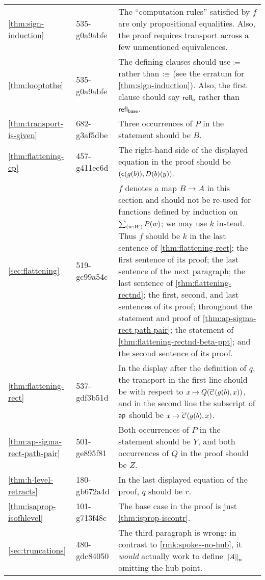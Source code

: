 \documentclass[
%
%
11pt %
]{article}
\begin{document}
\begin{longtable}{llp{10.5cm}}
  \cref{thm:sign-induction}
  & 535-g0a9abfe
  & The ``computation rules'' satisfied by $f$ are only propositional equalities.
  Also, the proof requires transport across a few unmentioned equivalences.\\
  \cref{thm:looptothe}
  & 535-g0a9abfe
  & The defining clauses should use $\defid$ rather than $\defeq$ (see the erratum for \cref{thm:sign-induction}).
  Also, the first clause should say $\refl{a}$ rather than $\refl{\base}$.\\
  \cref{thm:transport-is-given}
  & 682-g3af5dbe
  & Three occurrences of $P$ in the statement should be $B$.\\
  \cref{thm:flattening-cp}
  & 457-g411ec6d
  & The right-hand side of the displayed equation in the proof should be $(\cc(g(b)),D(b)(y))$.\\
  \cref{sec:flattening}
  & 519-gc99a54c
  & $f$ denotes a map $B\to A$ in this section and should not be re-used for functions defined by induction on $\sm{w:W} P(w)$; we may use $k$ instead.
  Thus $f$ should be $k$ in the last sentence of \cref{thm:flattening-rect}; the first sentence of its proof; the last sentence of the next paragraph; the last sentence of \cref{thm:flattening-rectnd}; the first, second, and last sentences of its proof; throughout the statement and proof of \cref{thm:ap-sigma-rect-path-pair}; the statement of \cref{thm:flattening-rectnd-beta-ppt}; and the second sentence of its proof.\\
  \cref{thm:flattening-rect}
  & 537-gdf3b51d
  & In the display after the definition of $q$, the transport in the first line should be with respect to $x\mapsto Q(\cct'(g(b),x))$, and in the second line the subscript of $\apfunc{}$ should be $x\mapsto \cct'(g(b),x)$.\\
  \cref{thm:ap-sigma-rect-path-pair}
  & 501-ge895f81
  & Both occurrences of $P$ in the statement should be $Y$, and both occurrences of $Q$ in the proof should be $Z$.\\
  \cref{thm:h-level-retracts}
  & 180-gb672a4d
  & In the last displayed equation of the proof, $q$ should be $r$.\\
  \cref{thm:isaprop-isofhlevel}
  & 101-g713f48c
  & The base case in the proof is just \cref{thm:isprop-iscontr}.\\
  \cref{sec:truncations}
  & 480-gdc84050
  & The third paragraph is wrong: in contrast to \cref{rmk:spokes-no-hub}, it \emph{would} actually work to define $\trunc nA$ omitting the hub point.\\

\end{longtable}
\end{document}
